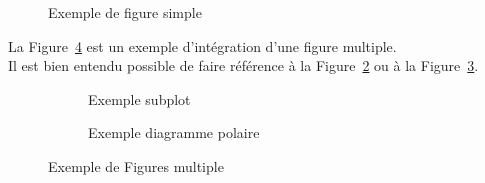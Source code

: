 \documentclass[a4paper,12pt]{report}
\begin{document}
\begin{figure}[hbtp]
	\centering
	\def\svgwidth{1\columnwidth}
	\fontsize{10pt}{10pt}\selectfont
	\caption{Exemple de figure simple}
	\label{figure_simple}
\end{figure}



La Figure~\ref{figure_multiple} est un exemple d'intégration d'une figure multiple. \\
Il est bien entendu possible de faire référence à la Figure~\ref{figure_subplot} ou à la Figure~\ref{figure_polaire}.

\begin{figure}[hbtp]
	\centering
	\begin{subfigure}[b]{0.8\textwidth}
		\centering
		\def\svgwidth{\columnwidth}
		\fontsize{10pt}{10pt}\selectfont
		\caption{Exemple subplot} 
		\label{figure_subplot}
	\end{subfigure}
	\qquad
	\begin{subfigure}[b]{0.7\textwidth}
		\centering
		\def\svgwidth{\columnwidth}
		\fontsize{10pt}{10pt}\selectfont
		\caption{Exemple diagramme polaire} 
		\label{figure_polaire}
	\end{subfigure}
	\caption{Exemple de Figures multiple} 
	\label{figure_multiple}
\end{figure}



\end{document}
